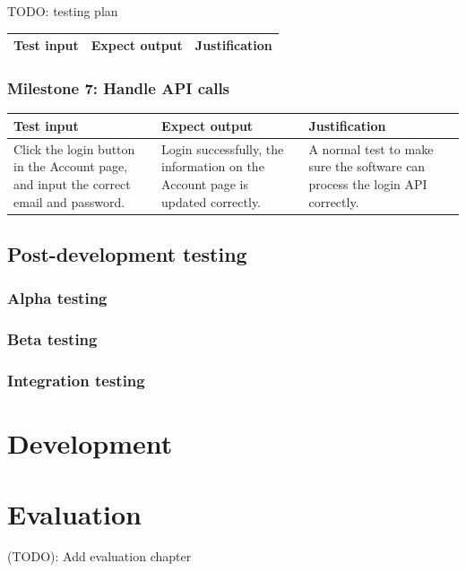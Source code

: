 \documentclass[a4paper]{report}
\begin{document}
TODO: testing plan

\begin{tabulary}{\textwidth}{|L|L|L|}
    \hline
    Test input & Expect output & Justification \\
    \hline
\end{tabulary}

\subsection{Milestone 7: Handle API calls}

\begin{tabulary}{\textwidth}{|L|L|L|}
    \hline
    Test input & Expect output & Justification \\
    \hline
    Click the login button in the Account page, and input the correct email and password. & Login successfully, the information on the Account page is updated correctly. & A normal test to make sure the software can process the login API correctly. \\
    \hline
\end{tabulary}

\section{Post-development testing}

\subsection{Alpha testing}
\subsection{Beta testing}
\subsection{Integration testing}

\chapter{Development}


\chapter{Evaluation}

 (TODO): Add evaluation chapter
\end{document}

